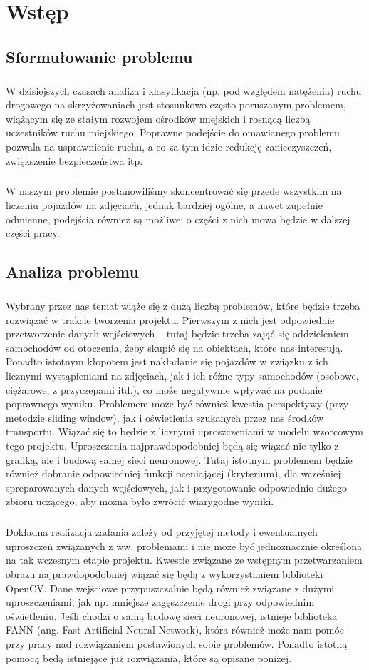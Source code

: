 \documentclass{article}
\begin{document}
\tableofcontents
\newpage

\section{Wstęp}
\subsection{Sformułowanie problemu}
\subparagraph{} W dzisiejszych czasach analiza i klasyfikacja (np. pod względem natężenia) ruchu drogowego na skrzyżowaniach jest stosunkowo często poruszanym problemem, wiążącym się ze stałym rozwojem ośrodków miejskich i rosnącą liczbą uczestników ruchu miejskiego. Poprawne podejście do omawianego problemu pozwala na usprawnienie ruchu, a co za tym idzie redukcję zanieczyszczeń, zwiększenie bezpieczeństwa itp.
\subparagraph{} W naszym problemie postanowiliśmy skoncentrować się przede wszystkim na liczeniu pojazdów na zdjęciach, jednak bardziej ogólne, a nawet zupełnie odmienne, podejścia również są możliwe; o części z nich mowa będzie w dalszej części pracy.

\subsection{Analiza problemu}
\subparagraph{} Wybrany przez nas temat wiąże się z dużą liczbą problemów, które będzie trzeba rozwiązać w trakcie tworzenia projektu. Pierwszym z nich jest odpowiednie przetworzenie danych wejściowych – tutaj będzie trzeba zająć się oddzieleniem samochodów od otoczenia, żeby skupić się na obiektach, które nas interesują. Ponadto istotnym kłopotem jest nakładanie się pojazdów w związku z ich licznymi wystąpieniami na zdjęciach, jak i ich różne typy samochodów (osobowe, ciężarowe, z przyczepami itd.), co może negatywnie wpływać na podanie poprawnego wyniku. Problemem może być również kwestia perspektywy (przy metodzie sliding window), jak i oświetlenia szukanych przez nas środków transportu. Wiązać się to będzie z licznymi uproszczeniami w modelu wzorcowym tego projektu. Uproszczenia najprawdopodobniej będą się wiązać nie tylko z grafiką, ale i budową samej sieci neuronowej. Tutaj istotnym problemem będzie również dobranie odpowiedniej funkcji oceniającej (kryterium), dla wcześniej spreparowanych danych wejściowych, jak i przygotowanie odpowiednio dużego zbioru uczącego, aby można było zwrócić wiarygodne wyniki. 

\subparagraph{} Dokładna realizacja zadania  zależy od przyjętej metody i ewentualnych uproszczeń związanych z ww. problemami i nie może być jednoznacznie określona na tak wczesnym etapie projektu. Kwestie związane ze wstępnym przetwarzaniem obrazu najprawdopodobniej wiązać się będą z wykorzystaniem biblioteki OpenCV. Dane wejściowe przypuszczalnie będą również związane z dużymi uproszczeniami, jak np. mniejsze zagęszczenie drogi przy odpowiednim oświetleniu. Jeśli chodzi o samą budowę sieci neuronowej, istnieje biblioteka FANN (ang. Fast Artificial Neural Network), która również może nam pomóc przy pracy nad rozwiązaniem postawionych sobie problemów. Ponadto istotną pomocą będą istniejące już rozwiązania, które są opisane poniżej.  
 
\end{document}
